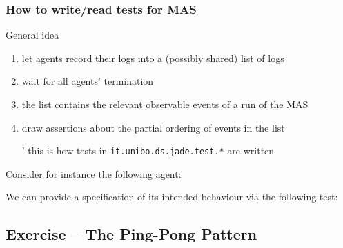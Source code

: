 \documentclass{beamer}\mode<presentation>{\usetheme{AMSCesenaPurpleAndGold}}
\begin{document}
\begin{frame}[allowframebreaks]
	\frametitle{How to write/read tests for MAS}
	
	\begin{block}{General idea}
		\begin{enumerate}
			\item let agents record their logs into a (possibly shared) \alert{list of logs}
			\item wait for all agents' termination
			\item the list contains the relevant \alert{observable events} of a run of the MAS
			\item draw assertions about the \alert{partial ordering} of events in the list
		\end{enumerate}
	\end{block}
	
	\bigskip
	
	\begin{itemize}
		\item[!] this is how tests in \texttt{it.unibo.ds.jade.\alert{test.*}} are written
	\end{itemize}

	\framebreak
	
	Consider for instance the following agent:
	
	
	\framebreak
	
	We can provide a specification of its intended behaviour via the following test:
	
	
\end{frame}

\startExercise

\subsection{Exercise \currentExercise{} -- The Ping-Pong Pattern}
\end{document}
